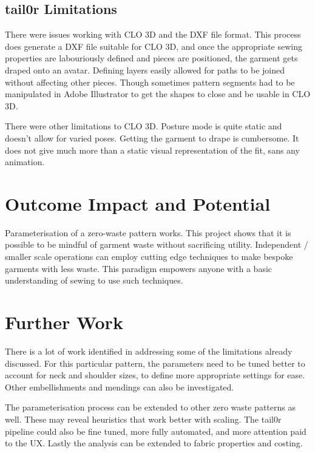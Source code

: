 \subsection{tail0r Limitations}
There were issues working with CLO 3D and the DXF file format. This process does generate a DXF file suitable for CLO 3D, and once the appropriate sewing properties are labouriously defined and pieces are positioned, the garment gets draped onto an avatar. Defining layers easily allowed for paths to be joined without affecting other pieces. Though sometimes pattern segments had to be manipulated in Adobe Illustrator to get the shapes to close and be usable in CLO 3D. 

There were other limitations to CLO 3D. Posture mode is quite static and doesn’t allow for varied poses. Getting the garment to drape is cumbersome. It does not give much more than a static visual representation of the fit, sans any animation.


\section{Outcome Impact and Potential}
Parameterisation of a zero-waste pattern works. This project shows that it is possible to be mindful of garment waste without sacrificing utility. Independent / smaller scale operations can employ cutting edge techniques to make bespoke garments with less waste. This paradigm empowers anyone with a basic understanding of sewing to use such techniques.

\section{Further Work}
There is a lot of work identified in addressing some of the limitations already discussed.
For this particular pattern, the parameters need to be tuned better to account for neck and shoulder sizes, to define more appropriate settings for ease. Other embellishments and mendings can also be investigated.

The parameterisation process can be extended to other zero waste patterns as well. These may reveal heuristics that work better with scaling.
The tail0r pipeline could also be fine tuned, more fully automated, and more attention paid to the UX. 
Lastly the analysis can be extended to fabric properties and costing.
